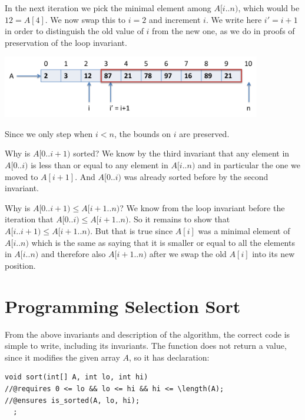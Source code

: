 In the next iteration we pick the minimal element among $A\lbrack i{..}n)$,
which would be $12 = A[4]$.  We now swap this to $i = 2$ and increment
$i$.  We write here $i' = i+1$ in order to distinguish the old value
of $i$ from the new one, as we do in proofs of preservation of the
loop invariant.
\begin{center}
\includegraphics[width=0.85\textwidth]{img/selsort4.png}
\end{center}

Since we only step when $i < n$, the bounds on $i$ are preserved.

Why is $A\lbrack 0{..}i{+}1)$ sorted?  We know by the third invariant that
any element in $A\lbrack 0{..}i)$ is less than or equal to any element in
$A\lbrack i{..}n)$ and in particular the one we moved to $A[i{+}1]$.  And
$A\lbrack 0{..}i)$ was already sorted before by the second invariant.

Why is $A\lbrack 0{..}i{+}1) \leq A\lbrack i{+}1{..}n)$?  We know from the loop
invariant before the iteration that $A\lbrack 0{..}i) \leq A\lbrack i{+}1{..}n)$.  So
it remains to show that $A\lbrack i{..}i{+}1) \leq A\lbrack i{+}1{..}n)$.  But that is
true since $A[i]$ was a minimal element of $A\lbrack i{..}n)$ which is the
same as saying that it is smaller or equal to all the elements in
$A\lbrack i{..}n)$ and therefore also $A\lbrack i{+}1{..}n)$ after we swap the old
$A[i]$ into its new position.

\clearpage
\section{Programming Selection Sort}
\label{sec:bigo:selectioncode}

From the above invariants and description of the algorithm, the
correct code is simple to write, including its invariants.
The function does not return a value, since it modifies the
given array $A$, so it has declaration:

\begin{lstlisting}[language = {[C0]C}]
void sort(int[] A, int lo, int hi)
//@requires 0 <= lo && lo <= hi && hi <= \length(A);
//@ensures is_sorted(A, lo, hi);
  ;
\end{lstlisting}

